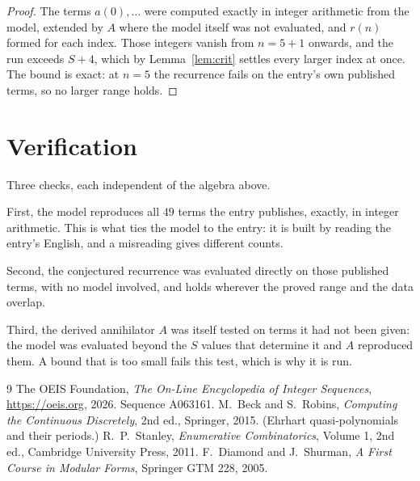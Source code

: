 \documentclass[11pt,a4paper]{article}
\theoremstyle{plain}
\theoremstyle{definition}
\begin{document}
\begin{proof}
The terms $a(0),\dots$ were computed exactly in integer arithmetic from the model, extended by
$A$ where the model itself was not evaluated, and $r(n)$ formed for each index. Those integers
vanish from $n=5+1$ onwards, and the run exceeds $S+4$, which by
Lemma~\ref{lem:crit} settles every larger index at once. The bound is exact: at $n=5$ the recurrence fails on the entry's own published terms, so no larger range holds.
\end{proof}

\section{Verification}

Three checks, each independent of the algebra above.

First, the model reproduces all $49$ terms the entry publishes, exactly, in integer
arithmetic. This is what ties the model to the entry: it is built by reading the entry's
English, and a misreading gives different counts.

Second, the conjectured recurrence was evaluated directly on those published terms, with no
model involved, and holds wherever the proved range and the data overlap.

Third, the derived annihilator $A$ was itself tested on terms it had not been given: the model
was evaluated beyond the $S$ values that determine it and $A$ reproduced them. A bound that is
too small fails this test, which is why it is run.

\begin{thebibliography}{9}
 The OEIS Foundation, \emph{The On-Line Encyclopedia of Integer
Sequences}, \url{https://oeis.org}, 2026. Sequence A063161.
 M.~Beck and S.~Robins, \emph{Computing the Continuous Discretely},
2nd ed., Springer, 2015. (Ehrhart quasi-polynomials and their periods.)
 R.~P.~Stanley, \emph{Enumerative Combinatorics}, Volume 1, 2nd ed.,
Cambridge University Press, 2011.
 F.~Diamond and J.~Shurman, \emph{A First Course in Modular Forms},
Springer GTM 228, 2005.
\end{thebibliography}
\end{document}
